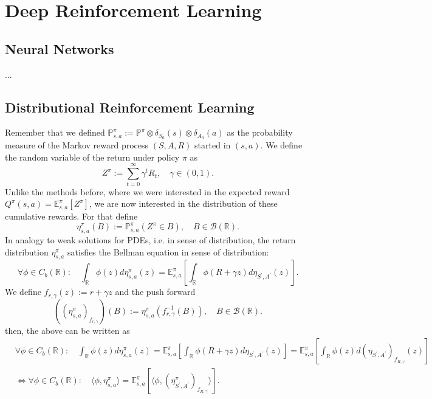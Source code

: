 \documentclass[../main.tex]{subfiles}  %
\begin{document}
\chapter{Deep Reinforcement Learning}

\section{Neural Networks}
... 
\section{Distributional Reinforcement Learning}
Remember that we defined $\mathbb{P}^\pi_{s,a} := \mathbb{P}^\pi \otimes \delta_{S_0}(s) \otimes \delta_{A_0}(a)$ as the probability measure of the Markov reward process $(S,A,R)$ started in $(s,a)$. We define the random variable of the return under policy $\pi$ as 
\[
Z^\pi := \sum_{t =0}^\infty \gamma^t R_t, \quad \gamma \in (0,1).
\]
Unlike the methods before, where we were interested in the expected reward $Q^\pi (s,a) = \mathbb{E}_{s,a}^\pi [Z^\pi]$, we are now interested in the distribution of these cumulative rewards. For that define
\[
\eta_{s,a}^\pi (B) := \mathbb{P}_{s,a}^\pi (Z^\pi \in  B), \quad B \in \mathcal{B}(\mathbb{R}).
\]
In analogy to weak solutions for PDEs, i.e. in sense of distribution, the return distribution $\eta_{s,a}^\pi$ satisfies the Bellman equation in sense of distribution:
\[
\forall \phi \in C_b(\mathbb{R}): \quad \int_{\mathbb{R}} \phi (z) d \eta_{s,a}^\pi (z) = \mathbb{E}_{s,a}^\pi [\int_\mathbb{R} \phi (R+\gamma z) d \eta_{S^\prime,A^\prime} (z) ].
\]
We define $f_{r,\gamma} (z) := r+\gamma z$ and the push forward 
\[
((\eta_{s,a}^\pi)_{f_{r,\gamma}}) (B) := \eta_{s,a}^\pi ( f^{-1}_{r,\gamma} ( B)), \quad B \in \mathcal{B}(\mathbb{R}).
\]
then, the above can be written as 
\begin{align*}
&\forall \phi \in C_b(\mathbb{R}): \quad \int_{\mathbb{R}} \phi (z) d \eta_{s,a}^\pi (z) = \mathbb{E}_{s,a}^\pi [\int_\mathbb{R} \phi (R+\gamma z) d \eta_{S^\prime,A^\prime} (z) ]= \mathbb{E}_{s,a}^\pi [ \int_\mathbb{R} \phi (z) d (\eta_{S^\prime,A^\prime})_{f_{R,\gamma}} (z)  ]\\
& \iff \forall \phi \in C_b(\mathbb{R}):\quad \langle \phi, \eta_{s,a}^\pi \rangle = \mathbb{E}_{s,a}^\pi [\langle \phi, (\eta_{S^\prime,A^\prime}^\pi)_{f_{R,\gamma}} \rangle].
\end{align*}
\end{document}
